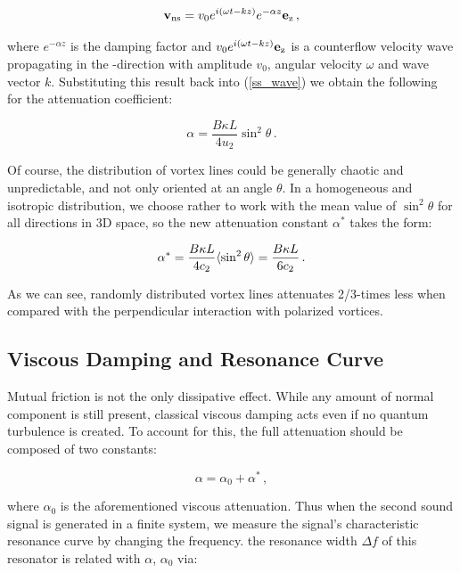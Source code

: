 \begin{equation}
\mathbf{v}_{\mathrm{ns}}
= v_0 e^{i(\omega t - kz)} e^{-\alpha z} \mathbf{e}_{\mathrm{z}}\,,
\end{equation}

where $e^{-\alpha z}$ is the damping factor and $v_0 e^{i(\omega t - kz)}\mathbf{e}_{\mathrm{z}}$ is a counterflow velocity wave propagating in the -direction with amplitude $v_0$, angular velocity $\omega$ and wave vector $k$. Substituting this result back into (\ref{ss_wave}) we obtain the following for the attenuation coefficient:

\begin{equation}
\alpha
= \frac{B\kappa L}{4 u_2} \sin^2 \theta\,.
\label{alpha}
\end{equation}

Of course, the distribution of vortex lines could be generally chaotic and unpredictable, and not only oriented at an angle $ \theta $. In a homogeneous and isotropic distribution, we choose rather to work with the mean value of $\sin^2{\theta}$ for all directions in 3D space, so the new attenuation constant $\alpha^*$ takes the form:

\begin{equation}
\alpha^*
= \frac{B\kappa L}{4 c_2} \langle \sin^2 \theta \rangle
= \frac{B\kappa L}{6 c_2}
\label{alpha_mean}\,.
\end{equation}

As we can see, randomly distributed vortex lines attenuates 2/3-times less when compared with the perpendicular interaction with polarized vortices. 


\subsection*{Viscous Damping and Resonance Curve}

Mutual friction is not the only dissipative effect. While any amount of normal component is still present, classical viscous damping acts
even if no quantum turbulence is created. To account for this, the full attenuation should be composed of two constants:

\begin{equation}
\alpha = \alpha_0 + \alpha^*\,,
\label{attenuation}
\end{equation}

where $\alpha_0$ is the aforementioned viscous attenuation. Thus when the second sound signal is generated in a finite system, we measure the signal's characteristic resonance curve by changing the frequency. the resonance width $\Delta f$ of this resonator is related with $ \alpha $, $ \alpha_0 $ via:

